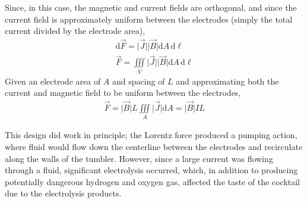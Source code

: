 \documentclass[]{article}
\begin{document}
Since, in this case, the magnetic and current fields are orthogonal, and since the current field is approximately uniform between the electrodes (simply the total current divided by the electrode area),
\begin{align}
\mathrm{d}\vec{F}=\lvert\vec{J}\rvert\lvert\vec{B}\rvert\mathrm{d}A\,\mathrm{d}\ell\\
\vec{F}=\iiint\limits_V\lvert\vec{J}\rvert\lvert\vec{B}\rvert\mathrm{d}A\,\mathrm{d}\ell
\end{align}
Given an electrode area of $A$ and spacing of $L$ and approximating both the current and magnetic field to be uniform between the electrodes,
\begin{align}
\vec{F}=\lvert\vec{B}\rvert L\iiint\limits_A\lvert\vec{J}\rvert\mathrm{d}A=\lvert\vec{B}\rvert IL
\end{align}
\par This design did work in principle; the Lorentz force produced a pumping action, where fluid would flow down the centerline between the electrodes and recirculate along the walls of the tumbler. However, since a large current was flowing through a fluid, significant electrolysis occurred, which, in addition to producing potentially dangerous hydrogen and oxygen gas, affected the taste of the cocktail due to the electrolysis products.
\end{document}
